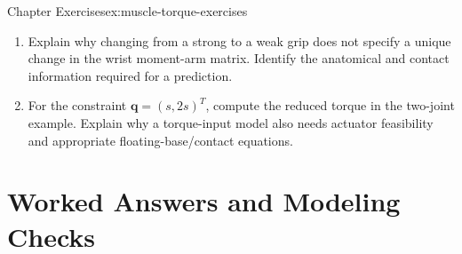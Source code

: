 \begin{exercises}{Chapter Exercises}{ex:muscle-torque-exercises}
\begin{enumerate}
\item Explain why changing from a strong to a weak grip does not specify a unique change in the wrist moment-arm matrix. Identify the anatomical and contact information required for a prediction.

\item For the constraint $\bm q=(s,2s)^T$, compute the reduced torque in the two-joint example. Explain why a torque-input model also needs actuator feasibility and appropriate floating-base/contact equations.
\end{enumerate}
\end{exercises}

\section{Worked Answers and Modeling Checks}

